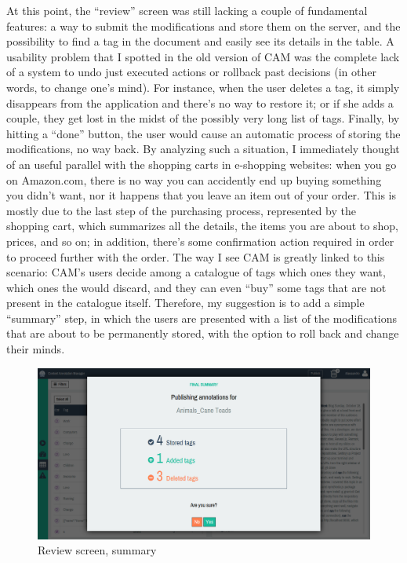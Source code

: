 \documentclass[12pt,svgnames]{memoir}
\begin{document}
At this point, the ``review'' screen was still lacking a couple of
fundamental features: a way to submit the modifications and store them
on the server, and the possibility to find a tag in the document and
easily see its details in the table. A usability problem that I spotted
in the old version of CAM was the complete lack of a system to undo just
executed actions or rollback past decisions (in other words, to change
one's mind). For instance, when the user deletes a tag, it simply
disappears from the application and there's no way to restore it; or if
she adds a couple, they get lost in the midst of the possibly very long
list of tags. Finally, by hitting a ``done'' button, the user would
cause an automatic process of storing the modifications, no way back. By
analyzing such a situation, I immediately thought of an useful parallel
with the shopping carts in e-shopping websites: when you go on
Amazon.com, there is no way you can accidently end up buying something
you didn't want, nor it happens that you leave an item out of your
order. This is mostly due to the last step of the purchasing process,
represented by the shopping cart, which summarizes all the details, the
items you are about to shop, prices, and so on; in addition, there's
some confirmation action required in order to proceed further with the
order. The way I see CAM is greatly linked to this scenario: CAM's users
decide among a catalogue of tags which ones they want, which ones the
would discard, and they can even ``buy'' some tags that are not present
in the catalogue itself. Therefore, my suggestion is to add a simple
``summary'' step, in which the users are presented with a list of the
modifications that are about to be permanently stored, with the option
to roll back and change their minds.

\begin{figure}[htbp]
\centering
\includegraphics{./src/img/review-summary.png}
\caption{Review screen, summary}
\end{figure}
\end{document}
